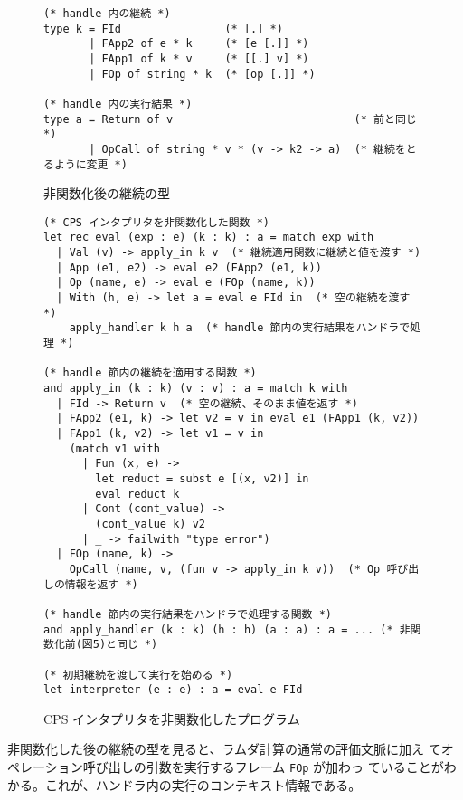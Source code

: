 \begin{figure}
\begin{spacing}{0.9} 
\begin{verbatim}
(* handle 内の継続 *)
type k = FId                (* [.] *)
       | FApp2 of e * k     (* [e [.]] *)
       | FApp1 of k * v     (* [[.] v] *)
       | FOp of string * k  (* [op [.]] *)

(* handle 内の実行結果 *)
type a = Return of v                            (* 前と同じ *)
       | OpCall of string * v * (v -> k2 -> a)  (* 継続をとるように変更 *)
\end{verbatim}
\caption{非関数化後の継続の型}
\label{figure:k_2defun}
\end{spacing}
\end{figure}

\begin{figure}[t]
\begin{spacing}{0.9} 
\begin{verbatim}
(* CPS インタプリタを非関数化した関数 *)
let rec eval (exp : e) (k : k) : a = match exp with
  | Val (v) -> apply_in k v  (* 継続適用関数に継続と値を渡す *)
  | App (e1, e2) -> eval e2 (FApp2 (e1, k))
  | Op (name, e) -> eval e (FOp (name, k))
  | With (h, e) -> let a = eval e FId in  (* 空の継続を渡す *)
    apply_handler k h a  (* handle 節内の実行結果をハンドラで処理 *)

(* handle 節内の継続を適用する関数 *)
and apply_in (k : k) (v : v) : a = match k with
  | FId -> Return v  (* 空の継続、そのまま値を返す *)
  | FApp2 (e1, k) -> let v2 = v in eval e1 (FApp1 (k, v2))
  | FApp1 (k, v2) -> let v1 = v in
    (match v1 with
      | Fun (x, e) ->
        let reduct = subst e [(x, v2)] in
        eval reduct k
      | Cont (cont_value) ->
        (cont_value k) v2
      | _ -> failwith "type error")
  | FOp (name, k) ->
    OpCall (name, v, (fun v -> apply_in k v))  (* Op 呼び出しの情報を返す *)

(* handle 節内の実行結果をハンドラで処理する関数 *)
and apply_handler (k : k) (h : h) (a : a) : a = ... (* 非関数化前(図5)と同じ *)

(* 初期継続を渡して実行を始める *)
let interpreter (e : e) : a = eval e FId
\end{verbatim}
\caption{CPS インタプリタを非関数化したプログラム}
\label{figure:2defun}
\end{spacing}
\end{figure}

非関数化した後の継続の型を見ると、ラムダ計算の通常の評価文脈に加え
てオペレーション呼び出しの引数を実行するフレーム \texttt{FOp} が加わっ
ていることがわかる。これが、ハンドラ内の実行のコンテキスト情報である。

